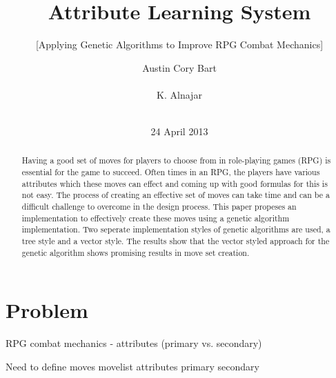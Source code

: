 \documentclass{acm_proc_article-sp}
\begin{document}
\title{Attribute Learning System}
\subtitle{[Applying Genetic Algorithms to Improve RPG Combat Mechanics]} %



\author{
\alignauthor
Austin Cory Bart\\
       \\
\alignauthor
K. Alnajar\\
       \\
\alignauthor
}

\date{24 April 2013}

\maketitle
\begin{abstract}
Having a good set of moves for players to choose from in role-playing games (RPG) is essential for the game to succeed.  Often times in an RPG, the players have various attributes which these moves can effect and coming up with good formulas for this is not easy. The process of creating an effective set of moves can take time and can be a difficult challenge to overcome in the design process. This paper propeses an implementation to effectively create these moves using a genetic algorithm implementation. Two seperate implementation styles of genetic algorithms are used, a tree style and a vector style. The results show that the vector styled approach for the genetic algorithm shows promising results in move set creation.
\end{abstract}




\section{Problem}
RPG combat mechanics - attributes (primary vs. secondary)

Need to define
moves
movelist
attributes
primary
secondary
\end{document}
